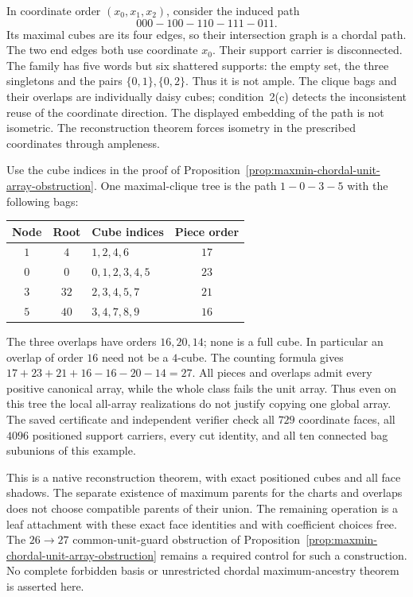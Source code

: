 \begin{remark}
\label{rem:maxmin-tree-nonample-path}
In coordinate order $(x_0,x_1,x_2)$, consider the induced path
\[
 000-100-110-111-011.
\]
Its maximal cubes are its four edges, so their intersection graph is a
chordal path. The two end edges both use coordinate $x_0$.
Their support carrier is disconnected. The family has five words but
six shattered supports: the empty set, the three singletons and the
pairs $\{0,1\},\{0,2\}$. Thus it is not ample.
The clique bags and their overlaps are individually daisy cubes;
condition~2(c) detects the inconsistent reuse of the coordinate direction.
The displayed embedding of the path is not isometric. The reconstruction
theorem forces isometry in the prescribed coordinates through ampleness.
\end{remark}

\begin{remark}
\label{rem:maxmin-chordal27-downset-tree}
Use the cube indices in the proof of
Proposition~\ref{prop:maxmin-chordal-unit-array-obstruction}.
One maximal-clique tree is the path $1-0-3-5$ with the following bags:
\begin{center}
\begin{tabular}{cclc}
Node & Root & Cube indices & Piece order\\\hline
$1$ & $4$ & $1,2,4,6$ & $17$\\
$0$ & $0$ & $0,1,2,3,4,5$ & $23$\\
$3$ & $32$ & $2,3,4,5,7$ & $21$\\
$5$ & $40$ & $3,4,7,8,9$ & $16$
\end{tabular}
\end{center}
The three overlaps have orders $16,20,14$; none is a full cube.
In particular an overlap of order $16$ need not be a $4$-cube.
The counting formula gives $17+23+21+16-16-20-14=27$.
All pieces and overlaps admit every positive canonical array, while the
whole class fails the unit array. Thus even on this tree the local
all-array realizations do not justify copying one global array.
The saved certificate and independent verifier check all $729$ coordinate
faces, all $4096$ positioned support carriers, every cut identity, and all
ten connected bag subunions of this example.
\end{remark}

This is a native reconstruction theorem, with exact positioned cubes and
all face shadows. The separate existence of maximum parents for the charts
and overlaps does not choose compatible parents of their union. The remaining
operation is a leaf attachment with these exact face identities and with
coefficient choices free. The $26\to27$ common-unit-guard obstruction of
Proposition~\ref{prop:maxmin-chordal-unit-array-obstruction} remains a
required control for such a construction. No complete forbidden basis or
unrestricted chordal maximum-ancestry theorem is asserted here.


